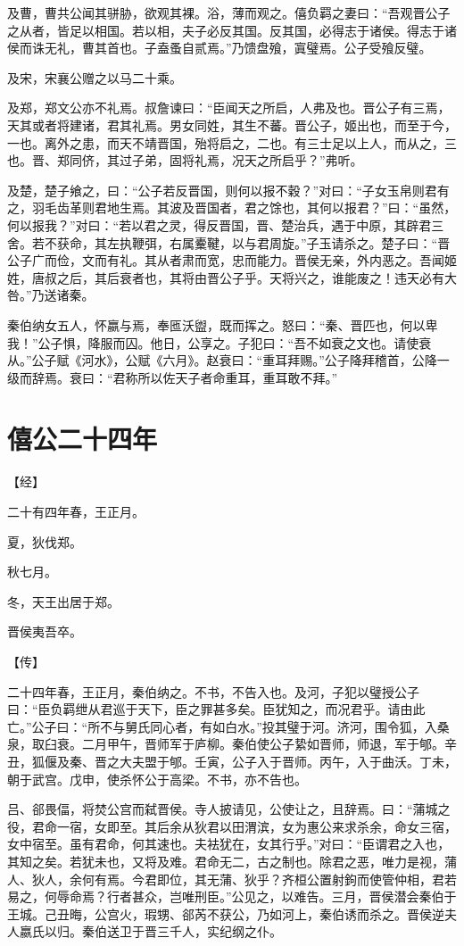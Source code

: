 \documentclass[a4paper,12pt,UTF8,twoside]{ctexbook}
\begin{document}
及曹，曹共公闻其骈胁，欲观其裸。浴，薄而观之。僖负羁之妻曰：“吾观晋公子之从者，皆足以相国。若以相，夫子必反其国。反其国，必得志于诸侯。得志于诸侯而诛无礼，曹其首也。子盍蚤自贰焉。”乃馈盘飱，寘璧焉。公子受飱反璧。

及宋，宋襄公赠之以马二十乘。

及郑，郑文公亦不礼焉。叔詹谏曰：“臣闻天之所启，人弗及也。晋公子有三焉，天其或者将建诸，君其礼焉。男女同姓，其生不蕃。晋公子，姬出也，而至于今，一也。离外之患，而天不靖晋国，殆将启之，二也。有三士足以上人，而从之，三也。晋、郑同侪，其过子弟，固将礼焉，况天之所启乎？”弗听。

及楚，楚子飨之，曰：“公子若反晋国，则何以报不穀？”对曰：“子女玉帛则君有之，羽毛齿革则君地生焉。其波及晋国者，君之馀也，其何以报君？”曰：“虽然，何以报我？”对曰：“若以君之灵，得反晋国，晋、楚治兵，遇于中原，其辟君三舍。若不获命，其左执鞭弭，右属櫜鞬，以与君周旋。”子玉请杀之。楚子曰：“晋公子广而俭，文而有礼。其从者肃而宽，忠而能力。晋侯无亲，外内恶之。吾闻姬姓，唐叔之后，其后衰者也，其将由晋公子乎。天将兴之，谁能废之！违天必有大咎。”乃送诸秦。

秦伯纳女五人，怀嬴与焉，奉匜沃盥，既而挥之。怒曰：“秦、晋匹也，何以卑我！”公子惧，降服而囚。他日，公享之。子犯曰：“吾不如衰之文也。请使衰从。”公子赋《河水》，公赋《六月》。赵衰曰：“重耳拜赐。”公子降拜稽首，公降一级而辞焉。衰曰：“君称所以佐天子者命重耳，重耳敢不拜。”

\chapter{僖公二十四年}



【经】

二十有四年春，王正月。

夏，狄伐郑。

秋七月。

冬，天王出居于郑。

晋侯夷吾卒。

【传】

二十四年春，王正月，秦伯纳之。不书，不告入也。及河，子犯以璧授公子曰：“臣负羁绁从君巡于天下，臣之罪甚多矣。臣犹知之，而况君乎。请由此亡。”公子曰：“所不与舅氏同心者，有如白水。”投其璧于河。济河，围令狐，入桑泉，取臼衰。二月甲午，晋师军于庐柳。秦伯使公子絷如晋师，师退，军于郇。辛丑，狐偃及秦、晋之大夫盟于郇。壬寅，公子入于晋师。丙午，入于曲沃。丁未，朝于武宫。戊申，使杀怀公于高梁。不书，亦不告也。

吕、郤畏偪，将焚公宫而弑晋侯。寺人披请见，公使让之，且辞焉。曰：“蒲城之役，君命一宿，女即至。其后余从狄君以田渭滨，女为惠公来求杀余，命女三宿，女中宿至。虽有君命，何其速也。夫袪犹在，女其行乎。”对曰：“臣谓君之入也，其知之矣。若犹未也，又将及难。君命无二，古之制也。除君之恶，唯力是视，蒲人、狄人，余何有焉。今君即位，其无蒲、狄乎？齐桓公置射鉤而使管仲相，君若易之，何辱命焉？行者甚众，岂唯刑臣。”公见之，以难告。三月，晋侯潜会秦伯于王城。己丑晦，公宫火，瑕甥、郤芮不获公，乃如河上，秦伯诱而杀之。晋侯逆夫人嬴氏以归。秦伯送卫于晋三千人，实纪纲之仆。
\end{document}
